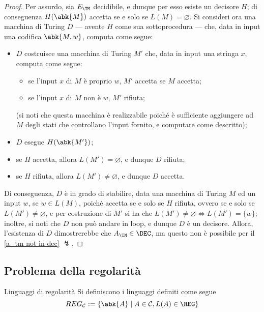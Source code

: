 \documentclass[a4paper, 12pt]{report}
\begin{document}
    \begin{proof}
        Per assurdo, sia $E_\TM$ decidibile, e dunque per esso esiste un decisore $H$; di conseguenza $H(\abk{M})$ accetta se e solo se $L(M) = \varnothing$. Si consideri ora una macchina di Turing $D$ --- avente $H$ come sua sottoprocedura --- che, data in input una codifica $\abk{M, w}$, computa come segue:

        \begin{itemize}
            \item $D$ costruisce una macchina di Turing $M'$ che, data in input una stringa $x$, computa come segue:
                \begin{itemize}
                    \item se l'input $x$ di $M$ è proprio $w$, $M'$ accetta se $M$ accetta;
                    \item se l'input $x$ di $M$ non è $w$, $M'$ rifiuta;
                \end{itemize}
                (si noti che questa macchina è realizzabile poiché è sufficiente aggiungere ad $M$ degli stati che controllano l'input fornito, e computare come descritto);
            \item $D$ esegue $H(\abk{M'})$;
            \item se $H$ accetta, allora $L(M') = \varnothing$, e dunque $D$ rifiuta;
            \item se $H$ rifiuta, allora $L(M') \neq \varnothing$, e dunque $D$ accetta.
        \end{itemize}

        Di conseguenza, $D$ è in grado di stabilire, data una macchina di Turing $M$ ed un input $w$, se $w \in L(M)$, poiché accetta se e solo se $H$ rifiuta, ovvero se e solo se $L(M') \neq \varnothing$, e per costruzione di $M'$ si ha che $L(M') \neq \varnothing \iff L(M') = \{ w\}$; inoltre, si noti che $D$ non può andare in loop, e dunque $D$ è un decisore. Allora, l'esistenza di $D$ dimostrerebbe che $A_\TM \in \DEC$, ma questo non è possibile per il \cref{a_tm not in dec} $\lightning$.
    \end{proof}

    \subsection{Problema della regolarità}

    \begin{frameddefn}{Linguaggi di regolarità}
        Si definiscono  i linguaggi definiti come segue $$REG_\mathcal{C} := \{\abk{A} \mid A \in \mathcal{C} , L(A) \in \REG\}$$
    \end{frameddefn}
\end{document}
